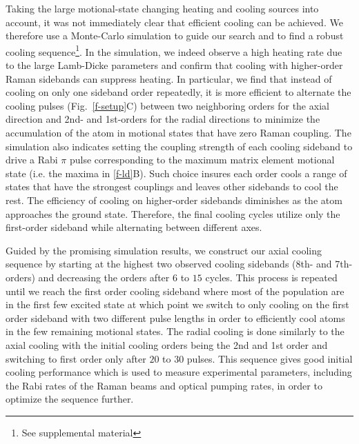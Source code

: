 \documentclass[aps,prl,twocolumn,groupedaddress]{revtex4-1}
\begin{document}
Taking the large motional-state changing heating and cooling sources into account,
it was not immediately clear that efficient cooling can be achieved.
We therefore use a Monte-Carlo simulation to guide our search and
to find a robust cooling sequence\footnote{See supplemental material}.
In the simulation, we indeed observe a high heating rate due to the large Lamb-Dicke parameters
and confirm that cooling with higher-order Raman sidebands can suppress heating.
In particular, we find that instead of cooling on only one sideband order repeatedly,
it is more efficient to alternate the cooling pulses (Fig.~\ref{f-setup}C) between two
neighboring orders for the axial direction and 2nd- and 1st-orders for the radial directions
to minimize the accumulation of the atom in motional states that have zero Raman coupling.
The simulation also indicates setting the coupling strength of each cooling sideband
to drive a Rabi $\pi$ pulse corresponding to the maximum matrix element motional state
(i.e. the maxima in \ref{f-ld}B).
Such choice insures each order cools a range of states that have the strongest
couplings and leaves other sidebands to cool the rest.
The efficiency of cooling on higher-order sidebands diminishes
as the atom approaches the ground state.
Therefore, the final cooling cycles utilize only the first-order sideband
while alternating between different axes.

Guided by the promising simulation results,
we construct our axial cooling sequence by starting at the highest
two observed cooling sidebands (8th- and 7th-orders)
and decreasing the orders after $6$ to $15$ cycles.
This process is repeated until we reach the first order cooling sideband where most of the
population are in the first few excited state at which point we switch to only cooling on the
first order sideband with two different pulse lengths in order to efficiently cool atoms in the
few remaining motional states.
The radial cooling is done similarly to the axial cooling with the initial cooling orders being
the 2nd and 1st order and switching to first order only after $20$ to $30$ pulses.
This sequence gives good initial cooling performance which is used to measure experimental
parameters, including the Rabi rates of the Raman beams and optical pumping rates,
in order to optimize the sequence further.
\end{document}
